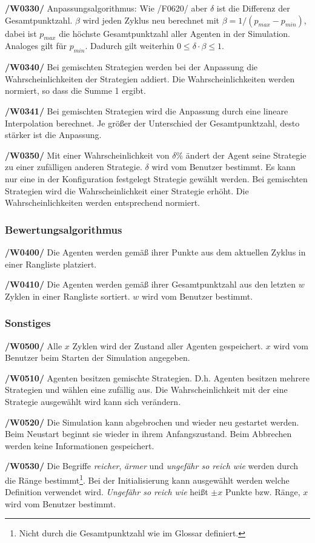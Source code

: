 \textbf{/W0330/}
Anpassungsalgorithmus: Wie /F0620/ aber $\delta$ ist die Differenz der Gesamtpunktzahl. {\color{red} $\beta$ wird jeden Zyklus neu berechnet mit $\beta = 1/(p_{max}-p_{min})$, dabei ist $p_{max}$ die höchste Gesamtpunktzahl aller Agenten in der Simulation. Analoges gilt für $p_{min}$. Dadurch gilt weiterhin $0 \leq \delta \cdot \beta \leq 1$.}

\textbf{/W0340/}
Bei gemischten Strategien werden bei der Anpassung die Wahrscheinlichkeiten der Strategien addiert. Die Wahrscheinlichkeiten werden normiert, so dass die Summe 1 ergibt.

{\color{red}
\textbf{/W0341/}
Bei gemischten Strategien wird die Anpassung durch eine lineare Interpolation berechnet. Je größer der Unterschied der Gesamtpunktzahl, desto stärker ist die Anpassung.
}

\textbf{/W0350/}
Mit einer Wahrscheinlichkeit von $\delta\%$ ändert der Agent seine Strategie zu einer zufälligen anderen Strategie. $\delta$ wird vom Benutzer bestimmt. Es kann nur eine in der Konfiguration festgelegt Strategie gewählt werden. Bei gemischten Strategien wird die Wahrscheinlichkeit einer Strategie erhöht. Die Wahrscheinlichkeiten werden entsprechend normiert.

\subsubsection{Bewertungsalgorithmus}

\textbf{/W0400/}
Die Agenten werden gemäß ihrer Punkte aus dem aktuellen Zyklus in einer Rangliste platziert.

\textbf{/W0410/}
Die Agenten werden gemäß ihrer Gesamtpunktzahl aus den letzten $w$ Zyklen in einer Rangliste sortiert. $w$ wird vom Benutzer bestimmt.

\subsubsection{Sonstiges}

\textbf{/W0500/}
Alle $x$ Zyklen wird der Zustand aller Agenten gespeichert. $x$ wird vom Benutzer beim Starten der Simulation angegeben.

\textbf{/W0510/}
Agenten besitzen gemischte Strategien. D.h. Agenten besitzen mehrere Strategien und wählen eine zufällig aus. Die Wahrscheinlichkeit mit der eine Strategie ausgewählt wird kann sich verändern.

\textbf{/W0520/}
Die Simulation kann abgebrochen und wieder neu gestartet werden. Beim Neustart beginnt sie wieder in ihrem Anfangszustand. Beim Abbrechen werden keine Informationen gespeichert.

\textbf{/W0530/}
Die Begriffe \emph{reicher}, \emph{ärmer} und \emph{ungefähr so reich wie} werden durch die Ränge bestimmt\footnote{Nicht durch die Gesamtpunktzahl wie im Glossar definiert.}. Bei der Initialisierung kann ausgewählt werden welche Definition verwendet wird. \emph{Ungefähr so reich wie} heißt $\pm x$ Punkte bzw. Ränge, $x$ wird vom Benutzer bestimmt.
